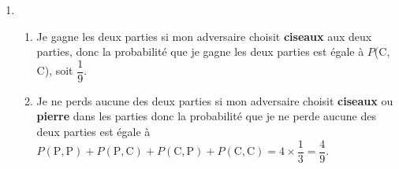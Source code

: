 \begin{enumerate}
\makeatother

\item  	\begin{enumerate}
		\item Je gagne les deux parties si mon adversaire choisit \og \textbf{ciseaux} \fg{} aux deux \linebreak parties, donc la probabilité que je gagne les deux parties est égale à \linebreak $P$(C, C), soit $\dfrac19$. 
		\item Je ne perds aucune des deux parties si mon adversaire choisit \og \textbf{ciseaux} \fg{} ou \og \textbf{pierre} \fg{} dans les parties donc la probabilité que je ne perde aucune des deux parties est égale à $P(\text{P}, \text{P})+P(\text{P}, \text{C})+P(\text{C}, \text{P}) + P(\text{C}, \text{C})=4\times \dfrac13=\dfrac49$. 
	\end{enumerate}
\end{enumerate}

\vspace{0,5cm}



